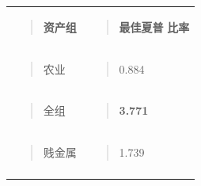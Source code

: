 \documentclass[UTF8]{ctexart}
\newcounter{none} %
\begin{document}
{\def\LTcaptype{none} %
\begin{longtable}[]{@{}
  >{\raggedright\arraybackslash}p{}
  >{\raggedright\arraybackslash}p{}@{}}
\toprule\noalign{}
\endhead
\bottomrule\noalign{}
\endlastfoot
\begin{minipage}[t]{\linewidth}\raggedright
\begin{quote}
\textbf{资产组}
\end{quote}
\end{minipage} & \begin{minipage}[t]{\linewidth}\raggedright
\begin{quote}
\textbf{最佳夏普} \textbf{比率}
\end{quote}
\end{minipage} \\
\begin{minipage}[t]{\linewidth}\raggedright
\begin{quote}
农业
\end{quote}
\end{minipage} & \begin{minipage}[t]{\linewidth}\raggedright
\begin{quote}
0.884
\end{quote}
\end{minipage} \\
\begin{minipage}[t]{\linewidth}\raggedright
\begin{quote}
全组
\end{quote}
\end{minipage} & \begin{minipage}[t]{\linewidth}\raggedright
\begin{quote}
\textbf{3.771}
\end{quote}
\end{minipage} \\
\begin{minipage}[t]{\linewidth}\raggedright
\begin{quote}
贱金属
\end{quote}
\end{minipage} & \begin{minipage}[t]{\linewidth}\raggedright
\begin{quote}
1.739
\end{quote}
\end{minipage} \\
\begin{minipage}[t]{\linewidth}\raggedright

\end{minipage}
\end{longtable}}
\end{document}
